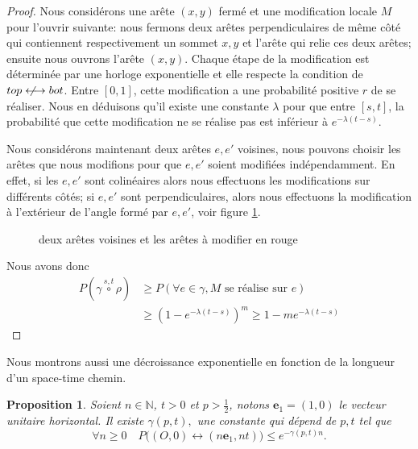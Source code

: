 \documentclass[titlepage,a4paper,12pt]{article}
\newcounter{prop}
\newtheorem{stc}[prop]{Proposition}
\newcommand{\nlongleftrightarrow}{\longleftrightarrow \kern-15pt\not \kern15pt}
\begin{document}
\begin{proof}
Nous considérons une arête $(x,y)$ fermé et une modification locale $M$ pour l'ouvrir suivante: nous fermons deux arêtes perpendiculaires de même côté qui contiennent respectivement un sommet $x,y$ et l'arête qui relie ces deux arêtes; ensuite nous ouvrons l'arête $(x,y)$. Chaque étape de la modification est déterminée par une horloge exponentielle et elle respecte la condition de $top\nlongleftrightarrow bot$. Entre $[0,1]$, cette modification a une probabilité positive $r$ de se réaliser. Nous en déduisons qu'il existe une constante $\lambda$ pour que entre $[s,t]$, la probabilité que cette modification ne se réalise pas est inférieur à $e^{-\lambda(t-s)}$. 

Nous considérons maintenant deux arêtes $e,e'$ voisines, nous pouvons choisir les arêtes que nous modifions pour que $e,e'$ soient modifiées indépendamment. En effet, si les $e,e'$ sont colinéaires alors nous effectuons les modifications sur différents côtés; si $e,e'$ sont perpendiculaires, alors nous effectuons la modification à l'extérieur de l'angle formé par $e,e'$, voir figure \ref{fig:mod}.

\begin{figure}[h]

\begin{minipage}{0.45\linewidth}
\center
{}
\end{minipage}
\hfill
\begin{minipage}{0.45\linewidth}
\center
{}
\end{minipage}
\caption{deux arêtes voisines et les arêtes à modifier en rouge}
\label{fig:mod}

\end{figure}

Nous avons donc 
\begin{align*}
 P(\gamma \overset{s,t}{\circ} \rho) &\geqslant P(\forall e \in \gamma, M \text{ se réalise sur } e) \\
 & \geqslant (1-e^{-\lambda (t-s)})^m \geqslant 1-me^{-\lambda (t-s)}
\end{align*} 
\end{proof}
Nous montrons aussi une décroissance exponentielle en fonction de la longueur d'un space-time chemin.
\begin{stc} \label{stc} Soient $n\in \mathbb{N}$, $t>0$ et $p> \frac{1}{2}$, notons $\mathbf{e}_1 = (1,0)$ le vecteur unitaire horizontal. Il existe $\gamma(p,t),$ une constante qui dépend de $p,t$ tel que 
$$\forall n\geqslant 0 \quad P\big((O,0)\longleftrightarrow (n\mathbf{e}_1,nt)\big) \leqslant e^{-\gamma(p,t)n}.$$
\end{stc}
\end{document}
